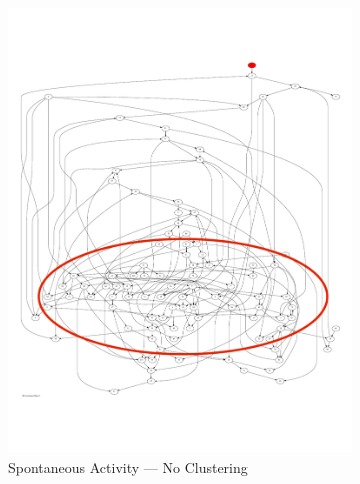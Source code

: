 \documentclass{article}
\begin{document}
\begin{figure}[H]
  \centering

  \begin{subfigure}{0.3\textwidth}
    \includegraphics[width=\textwidth]{spont_act_cluster}
    \caption{Spontaneous Activity --- No Clustering}
    \label{fig:spont_clusters}
  \end{subfigure}
  ~
  \begin{subfigure}{0.3\textwidth}

\end{subfigure}
\end{figure}
\end{document}

